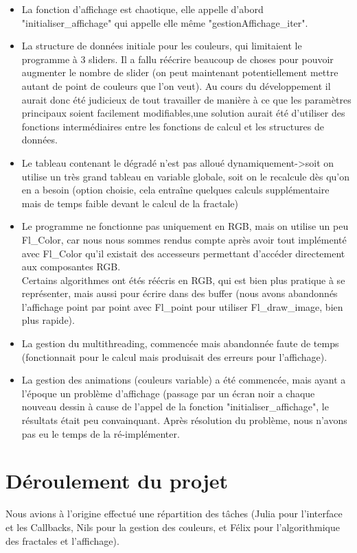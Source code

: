 \documentclass[a4paper,11pt]{article} \usepackage[T1]{fontenc} \usepackage[utf8]{inputenc} \usepackage[francais]{babel}
\begin{document}
\begin{itemize}
  \item La fonction d'affichage est chaotique, elle appelle d'abord "initialiser\_affichage" qui appelle elle même "gestionAffichage\_iter".%

  \item La structure de données initiale pour les couleurs, qui limitaient le programme à 3 sliders. Il a fallu réécrire beaucoup de choses pour pouvoir augmenter le nombre de slider (on peut maintenant potentiellement mettre autant de point de couleurs que l'on veut). Au cours du développement il aurait donc été judicieux de tout travailler de manière à ce que les paramètres principaux soient facilement modifiables,une solution aurait été d'utiliser des fonctions intermédiaires entre les fonctions de calcul et les structures de données.
  \item Le tableau contenant le dégradé n'est pas alloué dynamiquement->soit on utilise un très grand tableau en variable globale, soit on le recalcule dès qu'on en a besoin (option choisie, cela entraîne quelques calculs supplémentaire mais de temps faible devant le calcul de la fractale)
  \item Le programme ne fonctionne pas uniquement en RGB, mais on utilise un peu Fl\_Color, car nous nous sommes rendus compte après avoir tout implémenté avec Fl\_Color qu'il existait des accesseurs permettant d’accéder directement aux composantes RGB.\\
Certains algorithmes ont étés réécris en RGB, qui est bien plus pratique à se représenter, mais aussi pour écrire dans des buffer (nous avons abandonnés l'affichage point par point avec Fl\_point pour utiliser Fl\_draw\_image, bien plus rapide).
  \item La gestion du multithreading, commencée mais abandonnée faute de temps (fonctionnait pour le calcul mais produisait des erreurs pour l'affichage).
  \item La gestion des animations (couleurs variable) a été commencée, mais ayant a l'époque un problème d'affichage (passage par un écran noir a chaque nouveau dessin à cause de l'appel de la fonction "initialiser\_affichage", le résultats était peu convainquant. Après résolution du problème, nous n'avons pas eu le temps de la ré-implémenter.
\end{itemize}


\section{Déroulement du projet}
Nous avions à l'origine effectué une répartition des tâches (Julia pour l'interface et les Callbacks, Nils pour la gestion des couleurs, et Félix pour l'algorithmique des fractales et l'affichage).\\
\end{document}
